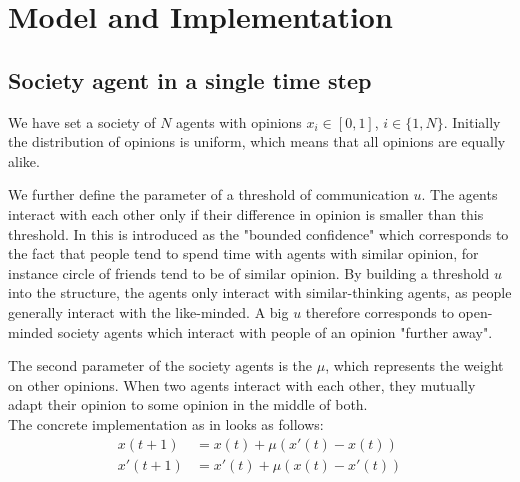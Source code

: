 \documentclass[11pt]{article}
\begin{document}
\section{Model and Implementation}
\subsection{Society agent in a single time step}
We have set a society of $N$ agents with opinions $x_i \in [0,1]$, $i \in \{1, N \}$. Initially the distribution of opinions is uniform, which means that all opinions are equally alike.

We further define the parameter of a threshold of communication $u$. The agents interact with each other only if their difference in opinion is smaller than this threshold. In \cite{Minor} this is introduced as the "bounded confidence" which corresponds to the fact that people tend to spend time with agents with similar opinion, for instance circle of friends tend to be of similar opinion. By building a threshold $u$ into the structure, the agents only interact with similar-thinking agents, as people generally interact with the like-minded. A big $u$ therefore corresponds to open-minded society agents which interact with people of an opinion "further away".

The second parameter of the society agents is the $\mu$, which represents the weight on other opinions. When two agents interact with each other, they mutually adapt their opinion to some opinion in the middle of both. \\

The concrete implementation as in \cite{Minor} looks as follows:
\begin{equation}
\begin{aligned}
x(t+1) &= x(t) + \mu(x'(t) - x(t))  \\
x'(t+1) &= x'(t) + \mu(x(t) - x'(t)) 
\end{aligned}
\end{equation}
\end{document}
